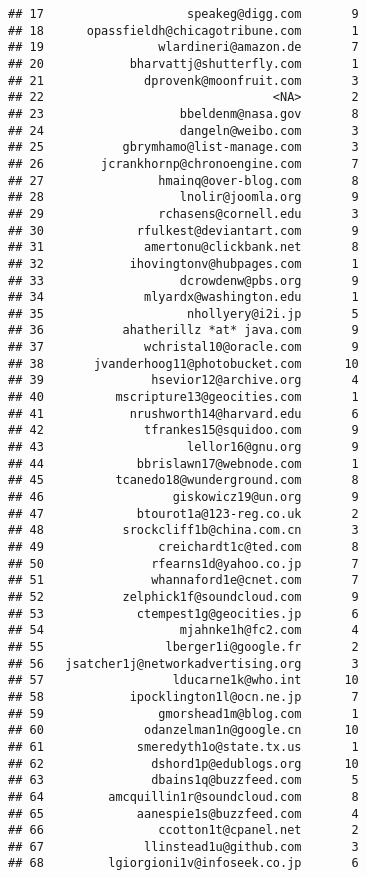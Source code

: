 \documentclass[]{article}
\begin{document}
\begin{verbatim}
## 17                    speakeg@digg.com       9
## 18      opassfieldh@chicagotribune.com       1
## 19                wlardineri@amazon.de       7
## 20            bharvattj@shutterfly.com       1
## 21              dprovenk@moonfruit.com       3
## 22                                <NA>       2
## 23                   bbeldenm@nasa.gov       8
## 24                   dangeln@weibo.com       3
## 25           gbrymhamo@list-manage.com       3
## 26        jcrankhornp@chronoengine.com       7
## 27                hmainq@over-blog.com       8
## 28                   lnolir@joomla.org       9
## 29                rchasens@cornell.edu       3
## 30             rfulkest@deviantart.com       9
## 31              amertonu@clickbank.net       8
## 32            ihovingtonv@hubpages.com       1
## 33                   dcrowdenw@pbs.org       9
## 34              mlyardx@washington.edu       1
## 35                    nhollyery@i2i.jp       5
## 36           ahatherillz *at* java.com       9
## 37              wchristal10@oracle.com       9
## 38       jvanderhoog11@photobucket.com      10
## 39               hsevior12@archive.org       4
## 40          mscripture13@geocities.com       1
## 41            nrushworth14@harvard.edu       6
## 42              tfrankes15@squidoo.com       9
## 43                    lellor16@gnu.org       9
## 44             bbrislawn17@webnode.com       1
## 45          tcanedo18@wunderground.com       8
## 46                  giskowicz19@un.org       9
## 47             btourot1a@123-reg.co.uk       2
## 48           srockcliff1b@china.com.cn       3
## 49                creichardt1c@ted.com       8
## 50               rfearns1d@yahoo.co.jp       7
## 51               whannaford1e@cnet.com       7
## 52           zelphick1f@soundcloud.com       9
## 53             ctempest1g@geocities.jp       6
## 54                   mjahnke1h@fc2.com       4
## 55                 lberger1i@google.fr       2
## 56   jsatcher1j@networkadvertising.org       3
## 57                  lducarne1k@who.int      10
## 58            ipocklington1l@ocn.ne.jp       7
## 59                gmorshead1m@blog.com       1
## 60              odanzelman1n@google.cn      10
## 61             smeredyth1o@state.tx.us       1
## 62               dshord1p@edublogs.org      10
## 63               dbains1q@buzzfeed.com       5
## 64         amcquillin1r@soundcloud.com       8
## 65             aanespie1s@buzzfeed.com       4
## 66                ccotton1t@cpanel.net       2
## 67              llinstead1u@github.com       3
## 68         lgiorgioni1v@infoseek.co.jp       6

\end{verbatim}
\end{document}

